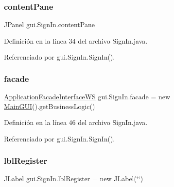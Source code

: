 \mbox{\label{classgui_1_1_sign_in_a0661fb8f7c58f5389415b3c24c3385bd}} 
\subsubsection{\texorpdfstring{contentPane}{contentPane}}
{\footnotesize\ttfamily J\+Panel gui.\+Sign\+In.\+content\+Pane\hspace{0.3cm}{\ttfamily [private]}}



Definición en la línea 34 del archivo Sign\+In.\+java.



Referenciado por gui.\+Sign\+In.\+Sign\+In().

\mbox{\label{classgui_1_1_sign_in_a1333e1c41f2354e4bab8acdeeafef7b0}} 
\subsubsection{\texorpdfstring{facade}{facade}}
{\footnotesize\ttfamily \mbox{\hyperlink{interfacebusiness_logic_1_1_application_facade_interface_w_s}{Application\+Facade\+Interface\+WS}} gui.\+Sign\+In.\+facade = new \mbox{\hyperlink{classgui_1_1_main_g_u_i}{Main\+G\+UI}}().get\+Business\+Logic()\hspace{0.3cm}{\ttfamily [private]}}



Definición en la línea 46 del archivo Sign\+In.\+java.



Referenciado por gui.\+Sign\+In.\+Sign\+In().

\mbox{\label{classgui_1_1_sign_in_a91128d3298a69d4306a3435d9f5002c6}} 
\subsubsection{\texorpdfstring{lblRegister}{lblRegister}}
{\footnotesize\ttfamily J\+Label gui.\+Sign\+In.\+lbl\+Register = new J\+Label(\char`\"{}\char`\"{})\hspace{0.3cm}{\ttfamily [private]}}




